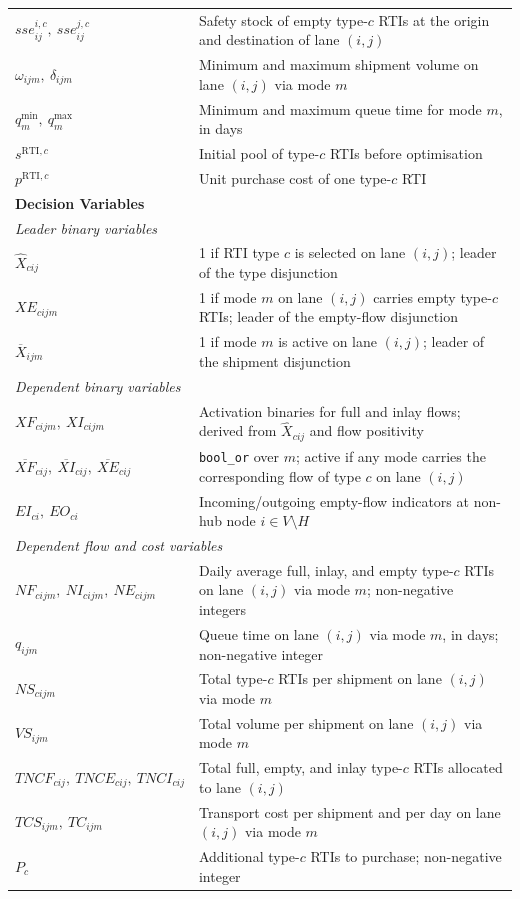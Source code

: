 \begin{longtable}{|p{}|p{}|}
$sse^{i,c}_{ij},\ sse^{j,c}_{ij}$
  & Safety stock of empty type-$c$ RTIs at the origin and
    destination of lane $(i,j)$ \\
$\omega_{ijm},\ \delta_{ijm}$
  & Minimum and maximum shipment volume on lane $(i,j)$
    via mode $m$ \\
$q^{\min}_{m},\ q^{\max}_{m}$
  & Minimum and maximum queue time for mode $m$, in days \\
$s^{\text{RTI},c}$
  & Initial pool of type-$c$ RTIs before optimisation \\
$p^{\text{RTI},c}$
  & Unit purchase cost of one type-$c$ RTI \\
\hline
\multicolumn{2}{|l|}{\textbf{Decision Variables}}\\ \hline
\multicolumn{2}{|l|}{\textit{Leader binary variables}}\\ \hline
$\hat{X}_{cij}$
  & 1 if RTI type $c$ is selected on lane $(i,j)$;
    leader of the type disjunction \\
$XE_{cijm}$
  & 1 if mode $m$ on lane $(i,j)$ carries empty type-$c$ RTIs;
    leader of the empty-flow disjunction \\
$\overline{X}_{ijm}$
  & 1 if mode $m$ is active on lane $(i,j)$;
    leader of the shipment disjunction \\
\hline
\multicolumn{2}{|l|}{\textit{Dependent binary variables}}\\ \hline
$XF_{cijm},\ XI_{cijm}$
  & Activation binaries for full and inlay flows;
    derived from $\hat{X}_{cij}$ and flow positivity \\
$\overline{XF}_{cij},\
 \overline{XI}_{cij},\
 \overline{XE}_{cij}$
  & \texttt{bool\_or} over $m$; active if any mode carries
    the corresponding flow of type $c$ on lane $(i,j)$ \\
$EI_{ci},\ EO_{ci}$
  & Incoming/outgoing empty-flow indicators at non-hub
    node $i \in V\setminus H$ \\
\hline
\multicolumn{2}{|l|}{\textit{Dependent flow and cost variables}}\\ \hline
$NF_{cijm},\ NI_{cijm},\ NE_{cijm}$
  & Daily average full, inlay, and empty type-$c$ RTIs on
    lane $(i,j)$ via mode $m$; non-negative integers \\
$q_{ijm}$
  & Queue time on lane $(i,j)$ via mode $m$, in days;
    non-negative integer \\
$NS_{cijm}$
  & Total type-$c$ RTIs per shipment on lane $(i,j)$ via mode $m$ \\
$VS_{ijm}$
  & Total volume per shipment on lane $(i,j)$ via mode $m$ \\
$TNCF_{cij},\ TNCE_{cij},\ TNCI_{cij}$
  & Total full, empty, and inlay type-$c$ RTIs allocated to
    lane $(i,j)$ \\
$TCS_{ijm},\ TC_{ijm}$
  & Transport cost per shipment and per day on lane $(i,j)$
    via mode $m$ \\
$P_{c}$
  & Additional type-$c$ RTIs to purchase; non-negative integer \\
\hline
\end{longtable}

